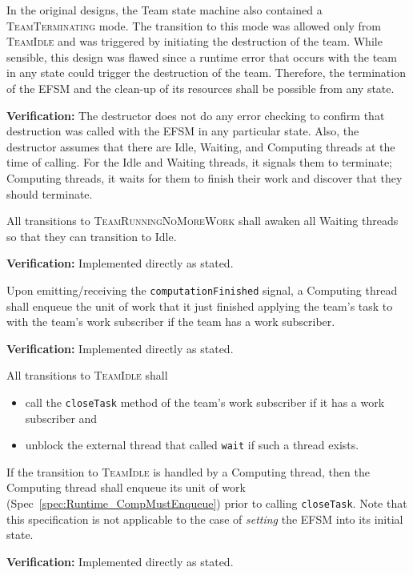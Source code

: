 \documentclass{article}
\newcommand{\TeamIdle}          {\textsc{TeamIdle}}
\newcommand{\TeamRunningNoMoreWork} {\textsc{TeamRunningNoMoreWork}}
\newcommand{\TeamTerminating}   {\textsc{TeamTerminating}}
\begin{document}
\begin{spec}
In the original designs, the Team state machine also contained a
{\TeamTerminating} mode.  The transition to this mode was allowed only from
{\TeamIdle} and was triggered by initiating the destruction of the team.  While
sensible, this design was flawed since a runtime error that occurs with the team
in any state could trigger the destruction of the team.  Therefore, the
termination of the EFSM and the clean-up of its resources shall be possible from
any state.
\end{spec}
\textbf{Verification:}\hspace{0.125in}  The destructor does not do any error
checking to confirm that destruction was called with the EFSM in any particular
state.  Also, the destructor assumes that there are Idle, Waiting, and Computing
threads at the time of calling.  For the Idle and Waiting threads, it signals 
them to terminate; Computing threads, it waits for them to finish their work and
discover that they should terminate.

\begin{spec}
\label{spec:Runtime_AwakenOnNoMoreWork}
All transitions to {\TeamRunningNoMoreWork} shall awaken all Waiting threads so
that they can transition to Idle.
\end{spec}
\textbf{Verification:}\hspace{0.125in}  Implemented directly as stated.

\begin{spec}
\label{spec:Runtime_CompMustEnqueue}
Upon emitting/receiving the \texttt{computationFinished} signal, a Computing
thread shall enqueue the unit of work that it just finished applying the team's
task to with the team's work subscriber if the team has a work subscriber.
\end{spec}
\textbf{Verification:}\hspace{0.125in}  Implemented directly as stated.

\begin{spec}
\label{spec:Runtime_IdleOutput}
All transitions to {\TeamIdle} shall
\begin{itemize}
\item{call the \texttt{closeTask} method of the team's work subscriber if it
has a work subscriber and }
\item{unblock the external thread that called \texttt{wait} if such a thread
exists.}
\end{itemize}
If the transition to {\TeamIdle} is handled by a Computing thread, then the
Computing thread shall enqueue its unit of work
(Spec~\ref{spec:Runtime_CompMustEnqueue}) prior to calling \texttt{closeTask}.
Note that this specification is not applicable to the case of \textit{setting}
the EFSM into its initial state.
\end{spec}
\textbf{Verification:}\hspace{0.125in}  Implemented directly as stated.
\end{document}
